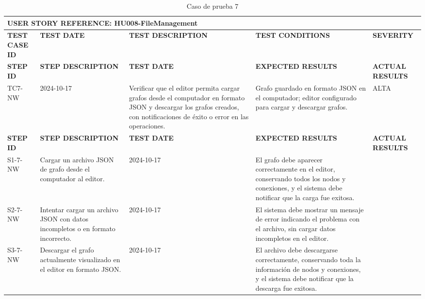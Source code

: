\documentclass[stu, 12pt, letterpaper, donotrepeattitle, floatsintext, natbib]{apa7}
\begin{document}
\begin{longtable}{|p{2cm}|p{3cm}|p{3cm}|p{3cm}|p{3cm}|}
    \caption{Caso de prueba 7} \label{tab:casos_prueba7} \\
    \hline
    \multicolumn{5}{|l|}{\textbf{USER STORY REFERENCE: HU008-FileManagement}} \\ \hline
    \textbf{TEST CASE ID} & \textbf{TEST DATE} & \textbf{TEST DESCRIPTION} & \textbf{TEST CONDITIONS} & \textbf{SEVERITY} \\ \hline
    \endfirsthead
    \hline
    \textbf{STEP ID} & \textbf{STEP DESCRIPTION} & \textbf{TEST DATE} & \textbf{EXPECTED RESULTS} & \textbf{ACTUAL RESULTS} \\ \hline
    \endhead
    TC7-NW & 2024-10-17 & Verificar que el editor permita cargar grafos desde el computador en formato JSON y descargar los grafos creados, con notificaciones de éxito o error en las operaciones. & Grafo guardado en formato JSON en el computador; editor configurado para cargar y descargar grafos. & ALTA \\ \hline
    \textbf{STEP ID} & \textbf{STEP DESCRIPTION} & \textbf{TEST DATE} & \textbf{EXPECTED RESULTS} & \textbf{ACTUAL RESULTS} \\ \hline
    S1-7-NW & Cargar un archivo JSON de grafo desde el computador al editor. & 2024-10-17 & El grafo debe aparecer correctamente en el editor, conservando todos los nodos y conexiones, y el sistema debe notificar que la carga fue exitosa. & \\ \hline
    S2-7-NW & Intentar cargar un archivo JSON con datos incompletos o en formato incorrecto. & 2024-10-17 & El sistema debe mostrar un mensaje de error indicando el problema con el archivo, sin cargar datos incompletos en el editor. & \\ \hline
    S3-7-NW & Descargar el grafo actualmente visualizado en el editor en formato JSON. & 2024-10-17 & El archivo debe descargarse correctamente, conservando toda la información de nodos y conexiones, y el sistema debe notificar que la descarga fue exitosa. & \\ \hline
\end{longtable}
\end{document}
